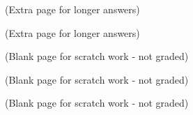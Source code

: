 \documentclass[12pt]{article}
\begin{document}
\clearpage
\begin{center} (Extra page for longer answers) \end{center}

\clearpage
\begin{center} (Extra page for longer answers) \end{center}

\clearpage
\begin{center} (Blank page for scratch work - not graded) \end{center}


\clearpage
\begin{center} (Blank page for scratch work - not graded) \end{center}


\clearpage
\begin{center} (Blank page for scratch work - not graded) \end{center}
\end{document}
